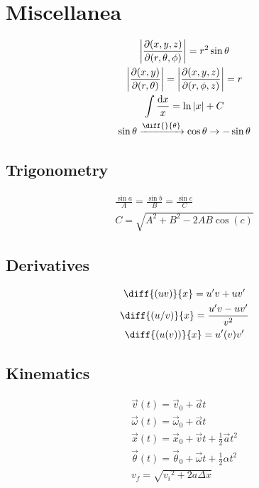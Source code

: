 \documentclass{cheatsheet}
\begin{document}
	\section{Miscellanea}	
		\begin{gather*}
			\left|\frac{\partial(x,y,z)}{\partial(r,\theta,\phi)}\right| = r^2 \sin \theta \\
			\left| \frac{\partial(x,y)}{\partial(r,\theta)} \right| = \left| \frac{\partial(x,y,z)}{\partial(r,\phi,z)} \right| = r\\
			\int \frac{\mathrm{d}x}{x} = \ln|x| + C\\
			\sin\theta \xrightarrow{\diff{}{\theta}} \cos\theta \rightarrow -\sin\theta\\
		\end{gather*}
	\subsection{Trigonometry}
		\begin{gather*}
			\frac{\sin a}{A} = \frac{\sin b}{B} = \frac{\sin c}{C}	\tag{law of sines}\\
			C = \sqrt{A^2 + B^2 - 2AB\cos(c)}	\tag{law of cosines}
		\end{gather*}
	\subsection{Derivatives}
		\begin{gather*}
			\diff{(uv)}{x} = u'v + uv'	\\
			\diff{(u/v)}{x} = \frac{u'v - uv'}{v^2}	\\
			\diff{( u(v) )}{x} = u'(v)v'
		\end{gather*}
	\subsection{Kinematics}
		\begin{gather*}
			\vec v(t) = \vec v_0 + \vec at 	\tag{velocity}\\
			\vec \omega(t) = \vec\omega_0 + \vec\alpha t	\tag{rot. form}\\
			\vec x(t) = \vec x_0 + \vec vt + \frac{1}{2}\vec a t^2	\tag{displacement}\\
			\vec\theta(t) = \vec\theta_0 + \vec\omega t + \frac{1}{2}\alpha t^2	\tag{rot. form}\\
			v_f = \sqrt{{v_i}^2 + 2a\Delta x}	\tag{$v_f$}
		\end{gather*}
\end{document}
